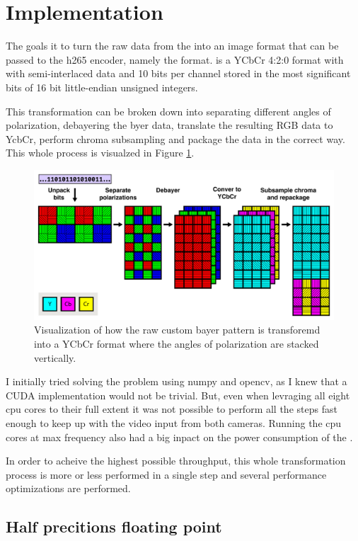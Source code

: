\section{Implementation}

The goals it to turn the raw data from the \cams into an image format that can be passed to the \gls{h265} encoder, namely the  format.
 is a YCbCr 4:2:0 format with with semi-interlaced data and 10 bits per channel stored in the most significant bits of 16 bit little-endian unsigned integers.

This transformation can be broken down into separating different angles of polarization, debayering the byer data, translate the resulting RGB data to YcbCr, perform chroma subsampling and package the data in the correct way.
This whole process is visualzed in Figure \ref{fig:transform}.

\begin{figure}[H]
    \centering
    \includegraphics[width=\textwidth]{figures/polarized_image/transform.pdf}
    \caption{Visualization of how the raw custom bayer pattern is transforemd into a YCbCr format where the angles of polarization are stacked vertically.}
    \label{fig:transform}
\end{figure}

I initially tried solving the problem using \gls{numpy} and \gls{opencv}, as I knew that a CUDA implementation would not be trivial.
But, even when levraging all eight \gls{cpu} cores to their full extent it was not possible to perform all the steps fast enough to keep up with the video input from both cameras.
Running the \gls{cpu} cores at max frequency also had a big inpact on the power consumption of the \jx.



In order to acheive the highest possible throughput, this whole transformation process is more or less performed in a single step and several performance optimizations are performed.










\subsection{Half precitions floating point}